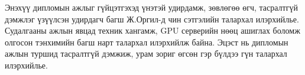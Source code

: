 \begin{acknowledgements}
\addchaptertocentry{\acknowledgementname}
Энэхүү дипломын ажлыг гүйцэтгэхэд үнэтэй удирдамж, зөвлөгөө өгч, тасралтгүй дэмжлэг үзүүлсэн удирдагч багш Ж.Оргил-д чин сэтгэлийн талархал илэрхийлье.
Судалгааны ажлын явцад техник хангамж, GPU серверийн нөөц ашиглах боломж олгосон тэнхимийн багш нарт талархал илэрхийлж байна.
Эцэст нь дипломын ажлын туршид тасралтгүй дэмжиж, урам зориг өгсөн гэр бүлдээ гүн талархал илэрхийлье.
\end{acknowledgements}